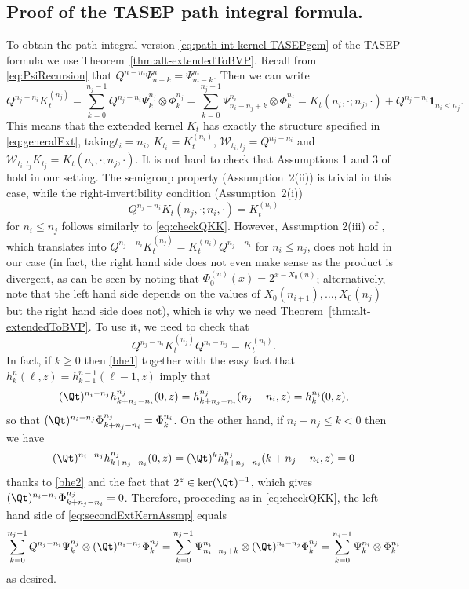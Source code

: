 \documentclass[]{pcmi}
\theoremstyle{plain}
\theoremstyle{definition}
\newcommand{\uno}[1]{\mathbf{1}_{#1}}
\begin{document}
\subsection{Proof of the TASEP path integral formula.}\label{app:proofPathIntTASEP}

To obtain the path integral version \eqref{eq:path-int-kernel-TASEPgem} of the TASEP formula we use Theorem~\ref{thm:alt-extendedToBVP}.
Recall from \eqref{eq:PsiRecursion} that $Q^{n-m}\Psi^{n}_{n-k}=\Psi^{m}_{m-k}$.
Then we can write
\begin{equation}\label{eq:checkQKK}
  Q^{n_j-n_i}K^{(n_j)}_t=\sum_{k=0}^{n_j-1}Q^{n_j-n_i}\Psi^{n_j}_{k}\otimes \Phi^{n_j}_{k}=\sum_{k=0}^{n_j-1}\Psi^{n_i}_{n_i-n_j+k}\otimes \Phi^{n_j}_{k}=K_t(n_i,\cdot;n_j,\cdot)+Q^{n_j-n_i}\uno{n_i<n_j}.
\end{equation}
This means that the extended kernel $K_t$ has exactly the structure specified in \eqref{eq:generalExt}, taking\break$t_i=n_i$, $K_{t_i}=K^{(n_i)}_t$, $\mathcal{W}_{t_i,t_j}=Q^{n_j-n_i}$ and $\mathcal{W}_{t_i,t_j}K_{t_j}=K_t(n_i,\cdot;n_j,\cdot)$.
It is not hard to check that Assumptions 1 and 3 of \cite[Thm. 3.3]{bcr} hold in our setting.
The semigroup property (Assumption~2(ii)) is trivial in this case, while the right-invertibility condition (Assumption~2(i)) 
\[
Q^{n_j-n_i}K_t(n_j,\cdot;n_i,\cdot)=K_t^{(n_i)}
\] 
for $n_i\leq n_j$ follows similarly to \eqref{eq:checkQKK}.
However, Assumption 2(iii) of \cite{bcr}, which translates into $Q^{n_j-n_i}K_t^{(n_j)}=K_t^{(n_i)}Q^{n_j-n_i}$ for $n_i\leq n_j$, does not hold in our case (in fact, the right hand side does not even make sense as the product is divergent, as can be seen by noting that $\Phi^{(n)}_0(x)=2^{x-X_0(n)}$; alternatively, note that the left hand side depends on the values of $X_0(n_{i+1}),\ldots,X_0(n_j)$ but the right hand side does not), which is why we need Theorem~\ref{thm:alt-extendedToBVP}.
To use it, we need to check that
\begin{equation}
  Q^{n_j-n_i}K_t^{(n_j)}Q^{n_i-n_j}=K_t^{(n_i)}.\label{eq:secondExtKernAssmp}
\end{equation}
In fact, if $k\geq0$ then \eqref{bhe1} together with the easy fact that $h^n_k(\ell,z)=h^{n-1}_{k-1}(\ell-1,z)$ imply that 
\[
(\Qt)^{n_i-n_j}h^{n_j}_{k+n_j-n_i}(0,z)=h^{n_j}_{k+n_j-n_i}(n_j-n_i,z)=h^{n_i}_{k}(0,z), 
\]
so that
$(\Qt)^{n_i-n_j}\Phi^{n_j}_{k+n_j-n_i}=\Phi^{n_i}_k$.
On the other hand, if $n_i-n_j\leq k<0$ then we have 
\[
(\Qt)^{n_i-n_j}h^{n_j}_{k+n_j-n_i}(0,z)=(\Qt)^kh^{n_j}_{k+n_j-n_i}(k+n_j-n_i,z)=0
\]
 thanks to \eqref{bhe2} and the fact that $2^z\in\ker(\Qt)^{-1}$, which gives $(\Qt)^{n_i-n_j}\Phi^{n_j}_{k+n_j-n_i}=0$.
Therefore, proceeding as in \eqref{eq:checkQKK}, the left hand side of \eqref{eq:secondExtKernAssmp} equals
\begin{equation}
  \sum_{k=0}^{n_j-1}Q^{n_j-n_i}\Psi^{n_j}_{k}\otimes(\Qt)^{n_i-n_j}\Phi^{n_j}_{k}=\sum_{k=0}^{n_j-1}\Psi^{n_i}_{n_i-n_j+k}\otimes(\Qt)^{n_i-n_j}\Phi^{n_j}_{k}
  =\sum_{k=0}^{n_i-1}\Psi^{n_i}_k\otimes\Phi^{n_i}_{k}
\end{equation}
as desired.
\end{document}
